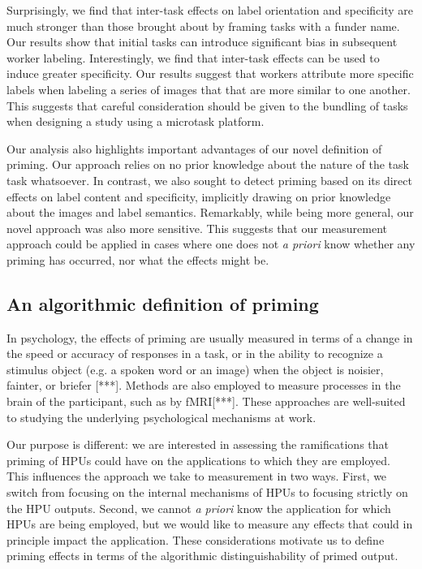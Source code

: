 \documentclass[a4paper]{report}
\begin{document}
Surprisingly, we find that inter-task effects on label orientation and 
specificity are much stronger than those brought about by framing tasks with a 
funder name.  Our results show that initial tasks can introduce significant 
bias in subsequent worker labeling.  Interestingly, we find that inter-task
effects can be used to induce greater specificity.  Our results suggest that
workers attribute more specific labels when labeling a series of images that
that are more similar to one another.  This suggests that careful 
consideration should be given to the bundling of tasks when designing a study 
using a microtask platform.

Our analysis also highlights important advantages of our novel definition of 
priming.  Our approach relies on no prior knowledge about the nature
of the task task whatsoever.  In contrast, we also sought to detect priming
based on its direct effects on label content and specificity, implicitly
drawing on prior knowledge about the images and label semantics.
Remarkably, while being more general, our novel approach was also more 
sensitive.  This suggests that our measurement approach could be applied in 
cases where one does not \emph{a priori} know whether any priming has occurred, 
nor what the effects might be.

\subsection*{An algorithmic definition of priming}

In psychology, the effects of priming are usually measured in terms of a 
change in the  
speed or accuracy of responses in a task, or in the ability to recognize a 
stimulus object (e.g. a spoken word or an image) when the object is noisier, 
fainter, or briefer [***].  Methods are also employed to measure processes
in the brain of the participant, such as by fMRI[***].  These approaches are 
well-suited to studying the underlying psychological mechanisms at work.

Our purpose is different: we are interested in assessing the ramifications
that priming of HPUs could have on the applications to which they are employed.
This influences the approach we take to measurement in two ways.  First, we 
switch from focusing on the internal mechanisms of HPUs to focusing strictly 
on the HPU outputs.  Second, we cannot \textit{a priori} know the 
application for which HPUs are being employed, but we would like to measure 
any effects that could in principle impact the application.  These 
considerations motivate us to define priming effects in terms of the 
algorithmic distinguishability of primed output.
\end{document}
